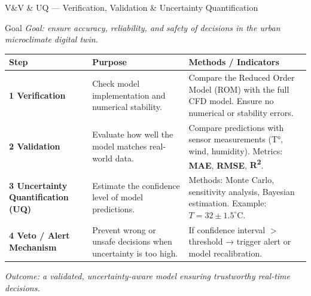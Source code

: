 \documentclass{beamer}
\begin{document}
\begin{frame}{V\&V \& UQ — Verification, Validation \& Uncertainty Quantification}
\centering
\tiny
\begin{block}{Goal}
    \textit{Goal: ensure accuracy, reliability, and safety of decisions in the urban microclimate digital twin.}
\end{block}
\vspace{0.4cm}
\begin{tabular}{|p{2.5cm}|p{3.5cm}|p{4.2cm}|}
\hline
\textbf{Step} & \textbf{Purpose} & \textbf{Methods / Indicators} \\
\hline
\textbf{1️ Verification} &
Check model implementation and numerical stability. &
Compare the Reduced Order Model (ROM) with the full CFD model.  
Ensure no numerical or stability errors. \\
\hline
\textbf{2️ Validation} &
Evaluate how well the model matches real-world data. &
Compare predictions with sensor measurements (T°, wind, humidity).  
Metrics: \textbf{MAE}, \textbf{RMSE}, \textbf{R\textsuperscript{2}}. \\
\hline
\textbf{3️ Uncertainty Quantification (UQ)} &
Estimate the confidence level of model predictions. &
Methods: Monte Carlo, sensitivity analysis, Bayesian estimation.  
Example: $T = 32 \pm 1.5^\circ$C. \\
\hline
\textbf{4️ Veto / Alert Mechanism} &
Prevent wrong or unsafe decisions when uncertainty is too high. &
If confidence interval $>$ threshold → trigger alert or model recalibration. \\
\hline
\end{tabular}

\vspace{0.3cm}
\textit{Outcome: a validated, uncertainty-aware model ensuring trustworthy real-time decisions.}
\end{frame}
\end{document}
